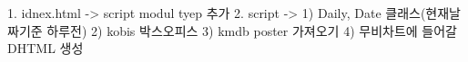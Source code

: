 1. idnex.html -> script modul tyep 추가
2. script -> 
	1) Daily, Date 클래스(현재날짜기준 하루전)
	2) kobis 박스오피스
	3) kmdb poster 가져오기 
	4) 무비차트에 들어갈 DHTML 생성





